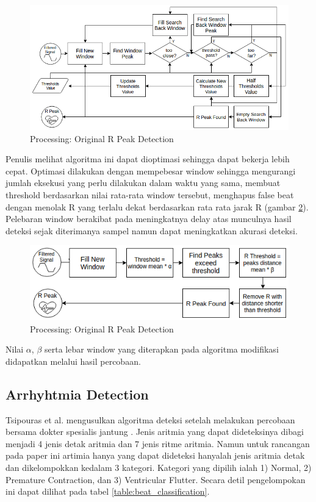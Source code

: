 \documentclass[]{indojc}
\begin{document}
\begin{figure}[htbp]
\centerline{\includegraphics[scale=0.35]{images/processing_ori.png}}
\caption{Processing: Original R Peak Detection}
\label{fig:processing_ori}
\end{figure}

Penulis melihat algoritma ini dapat dioptimasi sehingga dapat bekerja lebih cepat. Optimasi dilakukan dengan mempebesar window sehingga mengurangi jumlah eksekusi yang perlu dilakukan dalam waktu yang sama, membuat threshold berdasarkan nilai rata-rata window tersebut, menghapus false beat dengan menolak R yang terlalu dekat berdasarkan rata rata jarak R (gambar \ref{fig:processing_modif}). Pelebaran window berakibat pada meningkatnya delay atas munculnya hasil deteksi sejak diterimanya sampel namun dapat meningkatkan akurasi deteksi.

\begin{figure}[htbp]
\centerline{\includegraphics[scale=0.45]{images/processing_modif.png}}
\caption{Processing: Original R Peak Detection}
\label{fig:processing_modif}
\end{figure}

Nilai $\alpha$, $\beta$ serta lebar window yang diterapkan pada algoritma modifikasi didapatkan melalui hasil percobaan.

\subsection{Arrhyhtmia Detection}
Tsipouras et al. mengusulkan algoritma deteksi setelah melakukan percobaan bersama dokter spesialis jantung \cite{tsipouras}. Jenis aritmia yang dapat dideteksinya dibagi menjadi 4 jenis detak aritmia dan 7 jenis ritme aritmia. Namun untuk rancangan pada paper ini artimia hanya yang dapat dideteksi hanyalah jenis aritmia detak dan dikelompokkan kedalam 3 kategori. Kategori yang dipilih ialah 1) Normal, 2) Premature Contraction, dan 3) Ventricular Flutter. Secara detil pengelompokan ini dapat dilihat pada tabel \ref{table:beat_classification}.
\end{document}
